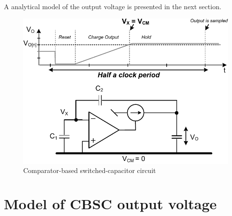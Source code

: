 
A analytical model of the output voltage is
presented in the next section.

\begin{figure}[htbp]
\centerline{ \includegraphics[width=\myfigwidth]{graphics/sc-cbsc}}
  \caption{Comparator-based switched-capacitor circuit}
  \label{cdesfig:sc-cbsc}
\end{figure}


\section{Model of CBSC output voltage}\label{cdessc:outmod}

